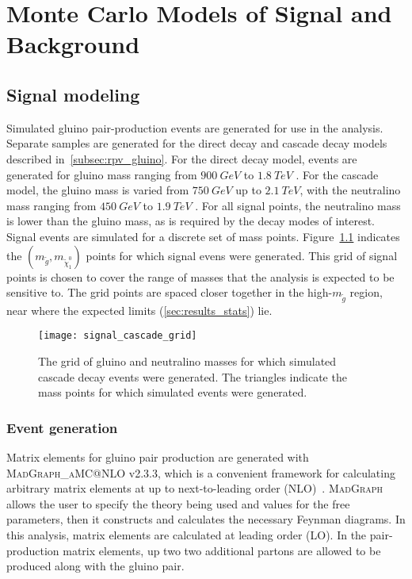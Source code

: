 \chapter{Monte Carlo Models of Signal and Background} \label{ch:monte_carlo}

\section{Signal modeling}\label{sec:signal_modeling}

Simulated gluino pair-production events are generated for use in the analysis.
Separate samples are generated for the direct decay and cascade decay models described in~\ref{subsec:rpv_gluino}.
For the direct decay model, events are generated for gluino mass ranging from $900~GeV$ to $1.8~TeV$ .
For the cascade model, the gluino mass is varied from $750~GeV$ up to $2.1~TeV$, with the neutralino mass ranging from $450~GeV$ to $1.9~TeV$ .
For all signal points, the neutralino mass is lower than the gluino mass, as is required by the decay modes of interest.
Signal events are simulated for a discrete set of mass points.
Figure~\ref{fig:signal_cascade_grid} indicates the $\left(m_{\tilde{g}}, m_{\tilde{\chi}_1^0}\right)$ points for which signal evens were generated.
This grid of signal points is chosen to cover the range of masses that the analysis is expected to be sensitive to.
The grid points are spaced closer together in the high-$m_{\tilde{g}}$ region, near where the expected limits (\ref{sec:results_stats}) lie.

\begin{figure}[!ht]
    \centering

    \texttt{[image: signal\_cascade\_grid]}

    \caption{The grid of gluino and neutralino masses for which simulated cascade decay events were generated.
    The triangles indicate the mass points for which simulated events were generated.}

    \label{fig:signal_cascade_grid}
\end{figure}

\subsection{Event generation}\label{subsec:signal_event_gen}

Matrix elements for gluino pair production are generated with \textsc{MadGraph\_aMC@NLO} v2.3.3, which is a convenient framework for calculating arbitrary matrix elements at up to next-to-leading order (NLO)~\cite{signal-madgraph}.
\textsc{MadGraph} allows the user to specify the theory being used and values for the free parameters, then it constructs and calculates the necessary Feynman diagrams.
In this analysis, matrix elements are calculated at leading order (LO).
In the pair-production matrix elements, up two two additional partons are allowed to be produced along with the gluino pair.

